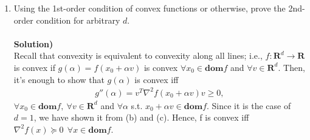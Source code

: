 \documentclass{article}
\begin{document}
\begin{enumerate}
\begin{enumerate}
\item Using the 1st-order condition of convex functions or otherwise, prove the 2nd-order condition for arbitrary $d$.\\\\
\textbf{Solution)}\\
Recall that convexity is equivalent to convexity along all lines; i.e., $f: \mathbf{R}^d \rightarrow \mathbf{R}$ is convex if $g(\alpha) = f(x_0 + \alpha v)$ is convex $\forall x_0 \in \textbf{dom}f$ and $\forall v \in \mathbf{R}^d$. Then, it's enough to show that $g(\alpha)$ is convex iff
\begin{align*}
g''(\alpha) = v^T \nabla^2 f(x_0 + \alpha v)v \geq 0,
\end{align*}
$\forall x_0 \in \textbf{dom}f, ~\forall v \in \mathbf{R}^d$ and $\forall \alpha$ s.t. $x_0 + \alpha v \in \textbf{dom}f$. Since it is the case of $d = 1$, we have shown it from (b) and (c). Hence, f is convex iff $\nabla^2 f(x) \succeq 0 ~~\forall x \in \textbf{dom}f$.

\end{enumerate}

\end{enumerate}
\end{document}

